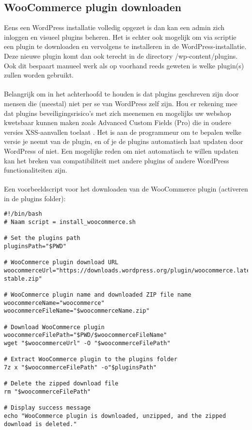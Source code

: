 \subsection{WooCommerce plugin downloaden}
Eens een WordPress installatie volledig opgezet is dan kan een admin zich inloggen en visueel plugins beheren. Het is echter ook mogelijk om via scriptie een plugin te downloaden en vervolgens te installeren in de WordPress-installatie. Deze nieuwe plugin komt dan ook terecht in de directory /wp-content/plugins. Ook dit bespaart manueel werk als op voorhand reeds geweten is welke plugin(s) zullen worden gebruikt.
\\\\
Belangrijk om in het achterhoofd te houden is dat plugins geschreven zijn door mensen die (meestal) niet per se van WordPress zelf zijn. Hou er rekening mee dat plugins beveiligingsrisico's met zich meenemen en mogelijks uw webshop kwetsbaar kunnen maken zoals Advanced Custom Fields (Pro) die in oudere versies XSS-aanvallen toelaat \autocite{Leemputten2023}. Het is aan de programmeur om te bepalen welke versie je neemt van de plugin, en of je de plugins automatisch laat updaten door WordPress of niet. Een mogelijke reden om niet automatisch te willen updaten kan het breken van compatibiliteit met andere plugins of andere WordPress functionaliteiten zijn.
\\\\
Een voorbeeldscript voor het downloaden van de WooCommerce plugin (activeren in de plugins folder):
\label{install_woocommerce_script}\begin{verbatim}
#!/bin/bash
# Naam script = install_woocommerce.sh

# Set the plugins path
pluginsPath="$PWD"

# WooCommerce plugin download URL
woocommerceUrl="https://downloads.wordpress.org/plugin/woocommerce.latest-stable.zip"

# WooCommerce plugin name and downloaded ZIP file name
woocommerceName="woocommerce" 
woocommerceFileName="$woocommerceName.zip"

# Download WooCommerce plugin
woocommerceFilePath="$PWD/$woocommerceFileName"
wget "$woocommerceUrl" -O "$woocommerceFilePath"

# Extract WooCommerce plugin to the plugins folder
7z x "$woocommerceFilePath" -o"$pluginsPath"

# Delete the zipped download file
rm "$woocommerceFilePath"

# Display success message
echo "WooCommerce plugin is downloaded, unzipped, and the zipped download is deleted."
\end{verbatim}

